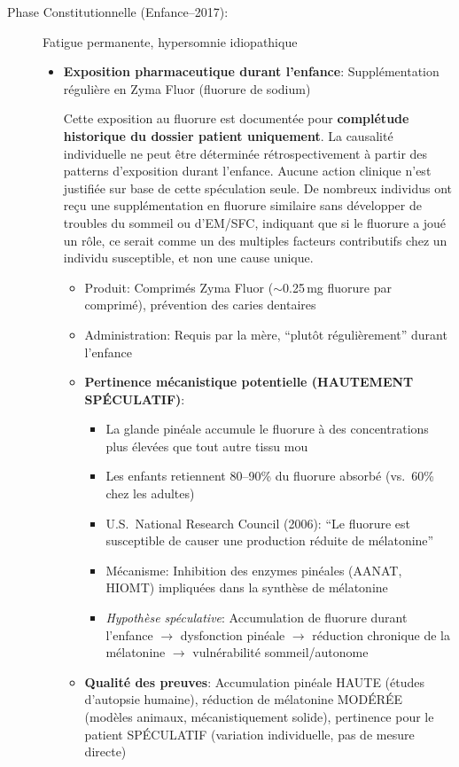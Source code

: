 \begin{description}
    \item[Phase Constitutionnelle (Enfance--2017):] Fatigue permanente, hypersomnie idiopathique
    \begin{itemize}
        \item \textbf{Exposition pharmaceutique durant l'enfance}: Supplémentation régulière en Zyma Fluor (fluorure de sodium)

        \begin{tcolorbox}[breakable,colback=yellow!10!white,colframe=orange!75!black,title=Facteur rétrospectif spéculatif]
        Cette exposition au fluorure est documentée pour \textbf{complétude historique du dossier patient uniquement}. La causalité individuelle ne peut être déterminée rétrospectivement à partir des patterns d'exposition durant l'enfance. Aucune action clinique n'est justifiée sur base de cette spéculation seule. De nombreux individus ont reçu une supplémentation en fluorure similaire sans développer de troubles du sommeil ou d'EM/SFC, indiquant que si le fluorure a joué un rôle, ce serait comme un des multiples facteurs contributifs chez un individu susceptible, et non une cause unique.
        \end{tcolorbox}

        \begin{itemize}
            \item Produit: Comprimés Zyma Fluor ($\sim$0.25\,mg fluorure par comprimé), prévention des caries dentaires
            \item Administration: Requis par la mère, ``plutôt régulièrement'' durant l'enfance
            \item \textbf{Pertinence mécanistique potentielle (HAUTEMENT SPÉCULATIF)}:
            \begin{itemize}
                \item La glande pinéale accumule le fluorure à des concentrations plus élevées que tout autre tissu mou
                \item Les enfants retiennent 80--90\% du fluorure absorbé (vs.\ 60\% chez les adultes)
                \item U.S.\ National Research Council (2006): ``Le fluorure est susceptible de causer une production réduite de mélatonine''
                \item Mécanisme: Inhibition des enzymes pinéales (AANAT, HIOMT) impliquées dans la synthèse de mélatonine
                \item \emph{Hypothèse spéculative}: Accumulation de fluorure durant l'enfance $\rightarrow$ dysfonction pinéale $\rightarrow$ réduction chronique de la mélatonine $\rightarrow$ vulnérabilité sommeil/autonome
            \end{itemize}
            \item \textbf{Qualité des preuves}: Accumulation pinéale HAUTE (études d'autopsie humaine), réduction de mélatonine MODÉRÉE (modèles animaux, mécanistiquement solide), pertinence pour le patient SPÉCULATIF (variation individuelle, pas de mesure directe)
        \end{itemize}


\end{itemize}
\end{description}
